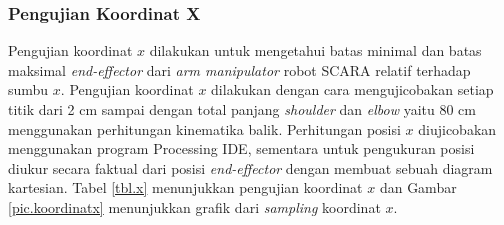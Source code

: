 \subsubsection{Pengujian Koordinat X}
 Pengujian koordinat $x$ dilakukan untuk mengetahui batas minimal dan batas maksimal \textit{end-effector} dari \textit{arm manipulator} robot SCARA relatif terhadap sumbu $x$. Pengujian koordinat $x$ dilakukan dengan cara mengujicobakan setiap titik dari 2 cm sampai dengan total panjang \textit{shoulder} dan \textit{elbow} yaitu 80 cm menggunakan perhitungan kinematika balik. Perhitungan posisi $x$ diujicobakan menggunakan program Processing IDE, sementara untuk pengukuran posisi diukur secara faktual dari posisi \textit{end-effector} dengan membuat sebuah diagram kartesian. Tabel \ref{tbl.x} menunjukkan pengujian koordinat $x$ dan Gambar \ref{pic.koordinatx} menunjukkan grafik dari \textit{sampling} koordinat $x$.
